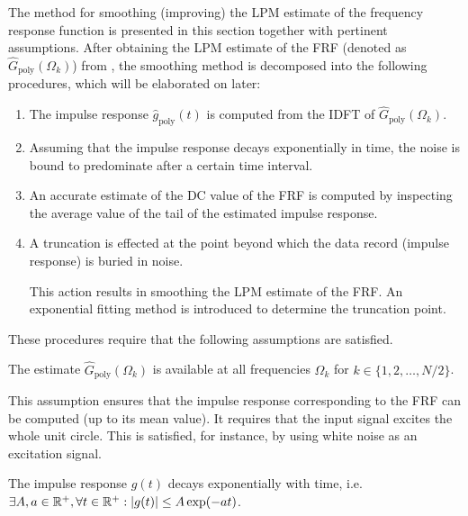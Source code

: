 The method for smoothing (improving) the \gls{LPM} estimate of the frequency response function  is presented in this section together with pertinent assumptions. After obtaining the \gls{LPM} estimate of the \gls{FRF} (denoted as $\hat{G}_{\mathrm{poly}}(\Omega_k)$) from , the smoothing method is decomposed into the following procedures, which will be elaborated on later:
\begin{enumerate}
\item The impulse response $\hat g_\mathrm{poly}(t)$  is computed from the \gls{IDFT} of $\hat{G}_{\mathrm{poly}}(\Omega_k)$.

\item
Assuming that the impulse response decays exponentially in time, the noise is bound to predominate after a certain time interval. 

\item
An accurate estimate of the \gls{DC} value of the \gls{FRF} is computed by inspecting the average value of the tail of the estimated impulse response.

\item
A truncation is effected at the point beyond which the data record (impulse response) is buried in noise. 

This action results in smoothing the \gls{LPM} estimate of the \gls{FRF}. 
An exponential fitting method is introduced to determine the truncation point.
\end{enumerate}

These procedures require that the following assumptions are satisfied.

\begin{assumption}
The estimate $\hat G_\mathrm{poly}(\Omega_k)$ is available at all frequencies $\Omega_k$ for $k\in\{1,2,\dots,N/2\}$.
\end{assumption}

This assumption ensures that the impulse response corresponding to the \gls{FRF} can be computed (up to its mean value). It requires that the input signal excites the whole unit circle. This is satisfied, for instance, by using white noise as an excitation signal.


\begin{assumption}\label{ass:imprespdecay}
The impulse response $g(t)$ decays exponentially with time, i.e. $\exists A, a \in \mathbb{R}^{+}, \forall t \in \mathbb{R}^{+}: \left| g(t) \right| \leq A \exp(- a t)$.
\end{assumption}

